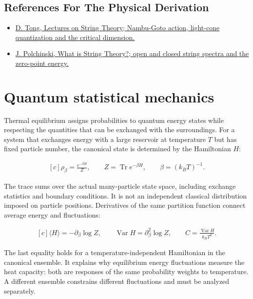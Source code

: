 \documentclass[11pt,oneside]{book}
\newenvironment{centeredalign}{\[\begin{gathered}[c]}{\end{gathered}\]}
\begin{document}
\subsection*{References For The Physical Derivation}
\begin{itemize}
\item \href{https://arxiv.org/abs/0908.0333}{D. Tong, Lectures on String Theory; Nambu-Goto action, light-cone quantization and the critical dimension.}
\item \href{https://arxiv.org/abs/hep-th/9411028}{J. Polchinski, What is String Theory?; open and closed string spectra and the zero-point energy.}
\end{itemize}





\clearpage

\section{Quantum statistical mechanics}

\label{topic:quantum-statistical-mechanics}

Thermal equilibrium assigns probabilities to quantum energy states while respecting the quantities that can be exchanged with the surroundings. For a system that exchanges energy with a large reservoir at temperature \(T\) but has fixed particle number, the canonical state is determined by the Hamiltonian \(H\):

\begin{centeredalign}
\rho_\beta=\frac{e^{-\beta H}}{Z},\qquad
Z=\operatorname{Tr}e^{-\beta H},\qquad \beta=(k_BT)^{-1}.
\end{centeredalign}

The trace sums over the actual many-particle state space, including exchange statistics and boundary conditions. It is not an independent classical distribution imposed on particle positions. Derivatives of the same partition function connect average energy and fluctuations:

\begin{centeredalign}
\langle H\rangle=-\partial_\beta\log Z,\qquad
\operatorname{Var}H=\partial_\beta^2\log Z,\qquad
C=\frac{\operatorname{Var}H}{k_BT^2}.
\end{centeredalign}

The last equality holds for a temperature-independent Hamiltonian in the canonical ensemble. It explains why equilibrium energy fluctuations measure the heat capacity: both are responses of the same probability weights to temperature. A different ensemble constrains different fluctuations and must be analyzed separately.
\end{document}
